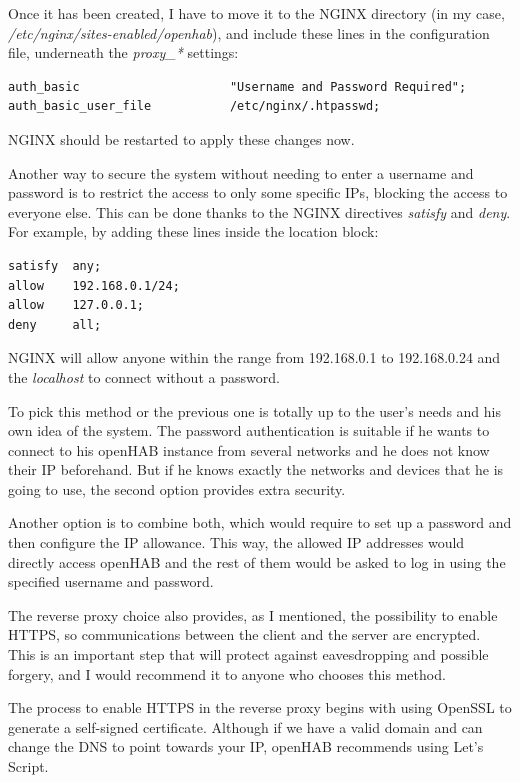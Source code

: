 Once it has been created, I have to move it to the NGINX directory (in my case, \textit{/etc/nginx/sites-enabled/openhab}), and
include these lines in the configuration file, underneath the \textit{proxy\_*} settings:

\begin{lstlisting}[style=Consola]
auth_basic                     "Username and Password Required";
auth_basic_user_file           /etc/nginx/.htpasswd;
\end{lstlisting}

NGINX should be restarted to apply these changes now.

Another way to secure the system without needing to enter a username and password is to restrict the access to only some specific
IPs, blocking the access to everyone else. This can be done thanks to the NGINX directives \textit{satisfy} and \textit{deny}.
For example, by adding these lines inside the location block:

\begin{lstlisting}[style=Consola]
satisfy  any;
allow    192.168.0.1/24;
allow    127.0.0.1;
deny     all;
\end{lstlisting}

NGINX will allow anyone within the range from 192.168.0.1 to 192.168.0.24 and the \textit{localhost} to connect without a password.

To pick this method or the previous one is totally up to the user’s needs and his own idea of the system. The password authentication
is suitable if he wants to connect to his openHAB instance from several networks and he does not know their IP beforehand. But if
he knows exactly the networks and devices that he is going to use, the second option provides extra security.

Another option is to combine both, which would require to set up a password and then configure the IP allowance. This way, the
allowed IP addresses would directly access openHAB and the rest of them would be asked to log in using the specified username and
password.

The reverse proxy choice also provides, as I mentioned, the possibility to enable HTTPS, so communications between the client and
the server are encrypted. This is an important step that will protect against eavesdropping and possible forgery, and I would recommend
it to anyone who chooses this method.

The process to enable HTTPS in the reverse proxy begins with using OpenSSL to generate a self-signed certificate. Although if we
have a valid domain and can change the DNS to point towards your IP, openHAB recommends using Let’s Script.\cite{letsEncryptWebsite}

